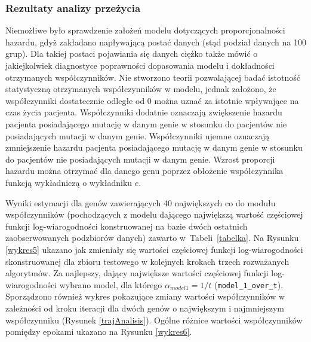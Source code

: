 \subsubsection{Rezultaty analizy przeżycia}

Niemożliwe było sprawdzenie założeń modelu dotyczących proporcjonalności
hazardu, gdyż zakładano napływającą postać danych (stąd podział danych
na 100 grup). Dla takiej postaci pojawiania się danych ciężko także
mówić o jakiejkolwiek diagnostyce poprawności dopasowania modelu i
dokładności otrzymanych współczynników. Nie stworzono teorii
pozwalającej badać istotność statystyczną otrzymanych współczynników w
modelu, jednak założono, że współczynniki dostatecznie odległe od $0$
można uznać za istotnie wpływające na czas życia pacjenta. Współczynniki
dodatnie oznaczają zwiększenie hazardu pacjenta posiadającego mutację w
danym genie w stosunku do pacjentów nie posiadających mutacji w danym
genie. Współczynniki ujemne oznaczają zmniejszenie hazardu pacjenta
posiadającego mutację w danym genie w stosunku do pacjentów nie
posiadających mutacji w danym genie. Wzrost proporcji hazardu można
otrzymać dla danego genu poprzez obłożenie współczynnika funkcją
wykładniczą o wykładniku $e$.


Wyniki estymacji dla genów zawierających 40 największych co do modułu
współczynników (pochodzących z modelu dającego największą wartość częściowej funkcji log-wiarogodności konstruowanej na bazie dwóch ostatnich zaobserwowanych podzbiorów danych) zawarto w~Tabeli~\ref{tabelka}.
Na Rysunku \ref{wykres5} ukazano jak zmieniały się wartości częściowej funkcji log-wiarogodności skonstruowanej dla zbioru testowego w kolejnych krokach trzech rozważanych algorytmów. Za najlepszy, dający największe wartości częściowej funkcji log-wiarogodności wybrano model, dla którego $\alpha_{model1} = 1/t$ (\texttt{model\_1\_over\_t}). Sporządzono również wykres pokazujące zmiany wartości współczynników w zależności od kroku iteracji dla dwóch genów o największym i najmniejszym współczynniku (Rysunek \ref{trajAnalisis}). Ogólne różnice wartości współczynników pomiędzy epokami ukazano na Rysunku \ref{wykres6}.







